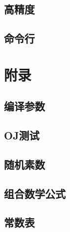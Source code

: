 \subsection{高精度}


\subsection{命令行}

\section{附录}
\subsection{编译参数}

\subsection{OJ测试}

\subsection{随机素数}

\subsection{组合数学公式}

\subsection{常数表}

